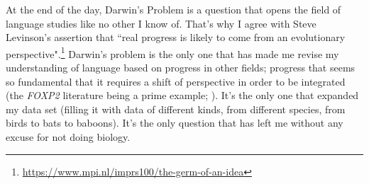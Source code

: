 At the end of the day, Darwin's Problem is a question that opens the field of language studies like no other I know of. That's why I agree with Steve Levinson's assertion that ``real progress is likely to come from an evolutionary perspective".\footnote{\url{https://www.mpi.nl/imprs100/the-germ-of-an-idea}} Darwin's problem is the only one that has made me revise my understanding of language based on progress in other fields; progress that seems so fundamental that it requires a shift of perspective in order to be integrated (the \textit{FOXP2} literature being a prime example; \cite{fisher2019human}). It's the only one that expanded my data set (filling it with data of different kinds, from different species, from birds to bats to baboons). It's the only question that has left me without any excuse for not doing biology.








